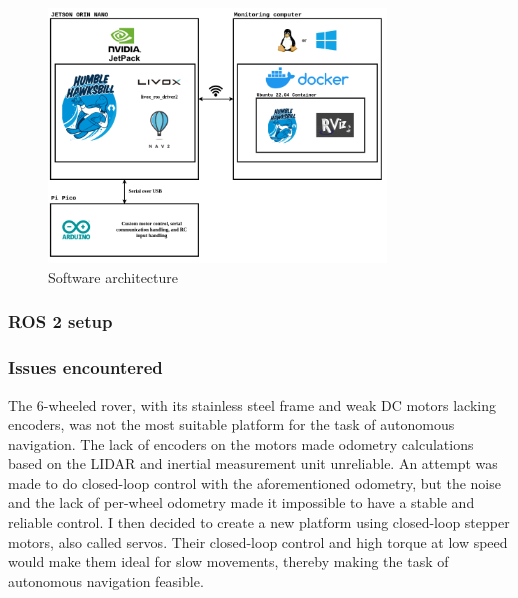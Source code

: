 \documentclass[11pt]{article}
\begin{document}
        \begin{figure}[H]
            \centering
            \includegraphics[width=0.8\textwidth]{Images/Software architecture rover.drawio.png}
            \caption{Software architecture}
            \label{fig:SW_architecture}
        \end{figure}


        \subsubsection{ROS 2 setup}
        
        

        \subsubsection{Issues encountered}
            

        The 6-wheeled rover, with its stainless steel frame and weak DC motors lacking encoders, was not the most suitable platform for the task of autonomous navigation. The lack of encoders on the motors made odometry calculations based on the LIDAR and inertial measurement unit unreliable. An attempt was made to do closed-loop control with the aforementioned odometry, but the noise and the lack of per-wheel odometry made it impossible to have a stable and reliable control. I then decided to create a new platform using closed-loop stepper motors, also called servos. Their closed-loop control and high torque at low speed would make them ideal for slow movements, thereby making the task of autonomous navigation feasible.
\end{document}
